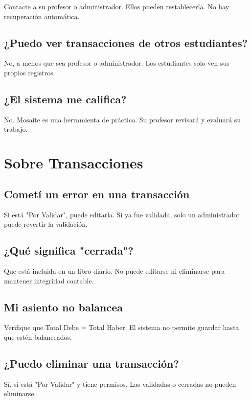 Contacte a su profesor o administrador. Ellos pueden restablecerla. No hay recuperación automática.

\subsection{¿Puedo ver transacciones de otros estudiantes?}

No, a menos que sea profesor o administrador. Los estudiantes solo ven sus propios registros.

\subsection{¿El sistema me califica?}

No. Mosaite es una herramienta de práctica. Su profesor revisará y evaluará su trabajo.

\section{Sobre Transacciones}

\subsection{Cometí un error en una transacción}

Si está "Por Validar", puede editarla. Si ya fue validada, solo un administrador puede revertir la validación.

\subsection{¿Qué significa "cerrada"?}

Que está incluida en un libro diario. No puede editarse ni eliminarse para mantener integridad contable.

\subsection{Mi asiento no balancea}

Verifique que Total Debe = Total Haber. El sistema no permite guardar hasta que estén balanceados.

\subsection{¿Puedo eliminar una transacción?}

Sí, si está "Por Validar" y tiene permisos. Las validadas o cerradas no pueden eliminarse.

